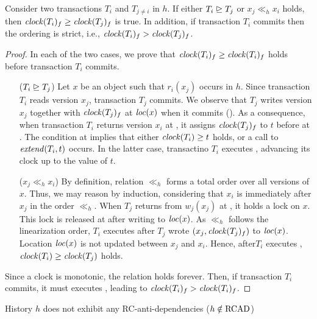 \begin{proposition}
  Consider two transactions $T_i$ and $T_{j \neq i}$ in $h$.
  If either $T_i \mathrel{\unrhd} T_j$ or  $x_j \ll_h x_i$ holds, then $\clockOf{T_i}_f \geq \clockOf{T_j}_f$ is true.
  In addition, if transaction $T_i$ commits then the ordering is strict, i.e., $\clockOf{T_i}_f > \clockOf{T_j}_f$.
\end{proposition}

\begin{proof}

  In each of the two cases, we prove that $\clockOf{T_i}_f \geq \clockOf{T_i}_f$ holds before transaction $T_i$ commits.
  \begin{itemize}
  \item[($T_i \mathrel{\unrhd} T_j$)]
    Let $x$ be an object such that $r_i(x_j)$ occurs in $h$.
    Since transaction $T_i$ reads version $x_j$, transaction $T_j$ commits.
    We observe that $T_j$ writes version $x_j$ together with $\clockOf{T_j}_f$ at $\locationOf{x}$ when it commits ().
    As a consequence, when transaction $T_i$ returns version $x_i$ at , it assigns $\clockOf{T_j}_f$ to $t$ before at .
    The condition at  implies that either $\clockOf{T_i} \geq t$ holds, or a call to $\stmExtend{T_i,t}$ occurs.
    In the latter case, transactino $T_i$ executes , advancing its clock up to the value of $t$.
  \item[($x_j \ll_h x_i$)]
    By definition, relation $\ll_h$ forms a total order over all versions of $x$.
    Thus, we may reason by induction, considering that $x_i$ is immediately after $x_j$ in the order $\ll_h$.
    When $T_j$ returns from $w_j(x_j)$ at , it holds a lock on $x$.
    This lock is released at  after writing to $\locationOf{x}$.
    As $\ll_h$ follows the linearization order, $T_i$ executes  after $T_j$ wrote $(x_j, \clockOf{T_j}_f)$ to $\locationOf{x}$.
    Location $\locationOf{x}$ is not updated between $x_j$ and $x_i$.
    Hence, after$T_i$ executes , $\clockOf{T_i} \geq \clockOf{T_j}$ holds.
  \end{itemize}
  Since a clock is monotonic, the relation holds forever.
  Then, if transaction $T_i$ commits, it must executes , leading to $\clockOf{T_i}_f > \clockOf{T_i}_f$.
\end{proof}

\begin{proposition}
  History $h$ does not exhibit any RC-anti-dependencies ($h \notin \RCAD$)
\end{proposition}

